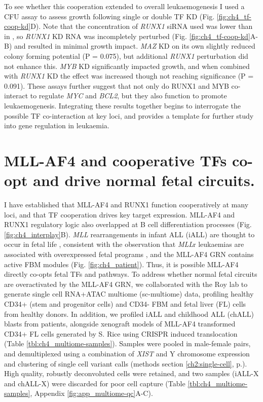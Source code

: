 To see whether this cooperation extended to overall leukaemogenesis I used a CFU assay to assess growth following single or double TF KD (Fig. \ref{fig:ch4_tf-coop-kd}D). Note that the concentration of \textit{RUNX1} siRNA used was lower than in \cite{wilkinson_runx1_2013}, so \textit{RUNX1} KD RNA was incompletely perturbed (Fig. \ref{fig:ch4_tf-coop-kd}A-B) and resulted in minimal growth impact. \textit{MAZ} KD on its own slightly reduced colony forming potential (P = 0.075), but additional \textit{RUNX1} perturbation did not enhance this. \textit{MYB} KD significantly impacted growth, and when combined with \textit{RUNX1} KD the effect was increased though not reaching significance (P = 0.091). These assays further suggest that not only do RUNX1 and MYB co-interact to regulate \textit{MYC} and \textit{BCL2}, but they also function to promote leukaemogenesis. Integrating these results together begins to interrogate the possible TF co-interaction at key loci, and provides a template for further study into gene regulation in leukaemia.

\section{\label{ch4:multiome}MLL-AF4 and cooperative TFs co-opt and drive normal fetal circuits.}

I have established that MLL-AF4 and RUNX1 function cooperatively at many loci, and that TF cooperation drives key target expression. MLL-AF4 and RUNX1 regulatory logic also overlapped at B cell differentiation processes (Fig. \ref{fig:ch4_interplay}B). \textit{MLL} rearrangements in infant ALL (iALL) are thought to occur in fetal life \citep{greaves_causal_2018, greaves_utero_2005, ford_utero_1993, jackson_origin_2021}, consistent with the observation that \textit{MLL}r leukaemias are associated with overexpressed fetal programs \citep{rice_human_2021}, and the MLL-AF4 GRN contains active FBM modules (Fig. \ref{fig:ch4_patient}). Thus, it is possible MLL-AF4 directly co-opts fetal TFs and pathways. To address whether normal fetal circuits are overactivated by the MLL-AF4 GRN, we collaborated with the Roy lab to generate single cell RNA+ATAC multiome (sc-multiome) data, profiling healthy CD34+ (stem and progenitor cells) and CD34- FBM and fetal liver (FL) cells from healthy donors. In addition, we profiled iALL and childhood ALL (chALL) blasts from patients, alongside xenograft models of MLL-AF4 transformed CD34+ FL cells generated by S. Rice using CRISPR induced translocation \citep{rice_human_2021} (Table \ref{tbl:ch4_multiome-samples}). Samples were pooled in male-female pairs, and demultiplexed using a combination of \textit{XIST} and Y chromosome expression and clustering of single cell variant calls (methods section \ref{ch2:single-cell}, p.\pageref{ch2:single-cell}). High quality, robustly deconvoluted cells were retained, and two samples (iALL-X and chALL-X) were discarded for poor cell capture (Table \ref{tbl:ch4_multiome-samples}, Appendix \ref{fig:app_multiome-qc}A-C).

